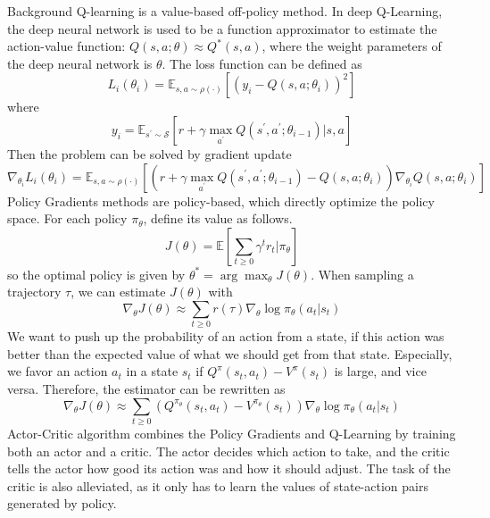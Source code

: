 \documentclass{article}
\begin{document}
\begin{section}{Background}
    Q-learning is a value-based off-policy method. In deep Q-Learning, the deep neural network is used to be a function approximator to estimate the action-value function: $Q(s,a;\theta)\approx Q^*(s,a)$, where the weight parameters of the deep neural network is $\theta$. The loss function can be defined as
    $$
    L_{i}\left(\theta_{i}\right)=\mathbb{E}_{s, a \sim \rho(\cdot)}\left[\left(y_{i}-Q\left(s, a ; \theta_{i}\right)\right)^{2}\right]
    $$
    where
    $$
    y_{i}=\mathbb{E}_{s^{\prime} \sim \mathcal{S}}\left[r+\gamma \max _{a^{\prime}} Q\left(s^{\prime}, a^{\prime} ; \theta_{i-1}\right) | s, a\right]
    $$
    Then the problem can be solved by gradient update
    $$
    \nabla_{\theta_{i}} L_{i}\left(\theta_{i}\right)=\mathbb{E}_{s, a \sim \rho(\cdot)}\left[\left(r+\gamma \max _{a^{\prime}} Q\left(s^{\prime}, a^{\prime} ; \theta_{i-1}\right)-Q\left(s, a ; \theta_{i}\right)\right) \nabla_{\theta_{i}} Q\left(s, a ; \theta_{i}\right)\right]
    $$
    Policy Gradients methods are policy-based, which directly optimize the policy space. For each policy $\pi_{\theta}$, define its value as follows.
    $$
    J(\theta)=\mathbb{E}\left[\sum_{t \geq 0} \gamma^{t} r_{t} | \pi_{\theta}\right]
    $$
    so the optimal policy is given by $\theta^*=\arg\max_{\theta}J(\theta)$.
    When sampling a trajectory $\tau$, we can estimate $J(\theta)$ with
    $$
    \nabla_{\theta} J(\theta) \approx \sum_{t \geq 0} r(\tau) \nabla_{\theta} \log \pi_{\theta}\left(a_{t} | s_{t}\right)
    $$
    We want to push up the probability of an action from a state, if this action was better than the expected value of what we should get from that state. Especially, we favor an action $a_t$ in a state $s_t$ if $Q^{\pi}\left(s_{t}, a_{t}\right)-V^{\pi}\left(s_{t}\right)$ is large, and vice versa. Therefore, the estimator can be rewritten as
    $$
    \nabla_{\theta} J(\theta) \approx \sum_{t \geq 0}\left(Q^{\pi_{\theta}}\left(s_{t}, a_{t}\right)-V^{\pi_{\theta}}\left(s_{t}\right)\right) \nabla_{\theta} \log \pi_{\theta}\left(a_{t} | s_{t}\right)
    $$
    Actor-Critic algorithm combines the Policy Gradients and Q-Learning by training both an actor and a critic. The actor decides which action to take, and the critic tells the actor how good its action was and how it should adjust. The task of the critic is also alleviated, as it only has to learn the values of state-action pairs generated by policy. 
\end{section}
\end{document}
